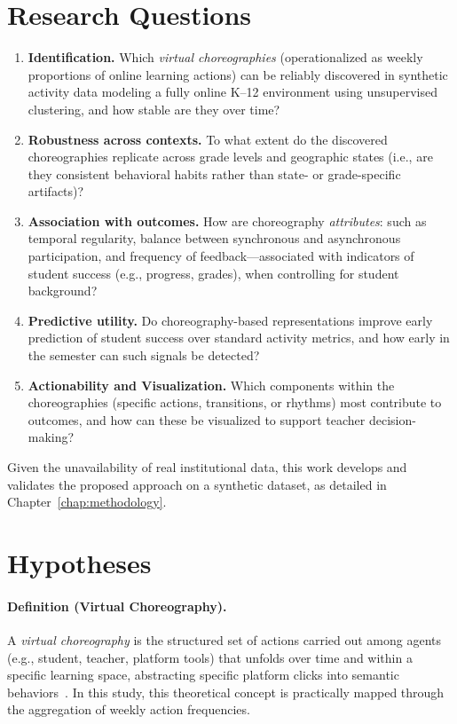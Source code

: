 \section{Research Questions} \label{sec:rqs}
\begin{enumerate}
  \item[\textbf{RQ1}] \textbf{Identification.} Which \emph{virtual choreographies} (operationalized as weekly proportions of online learning actions) can be reliably discovered in synthetic activity data modeling a fully online K--12 environment using unsupervised clustering, and how stable are they over time?
  \item[\textbf{RQ2}] \textbf{Robustness across contexts.} To what extent do the discovered choreographies replicate across grade levels and geographic states (i.e., are they consistent behavioral habits rather than state- or grade-specific artifacts)?
  \item[\textbf{RQ3}] \textbf{Association with outcomes.} How are choreography \emph{attributes}: such as temporal regularity, balance between synchronous and asynchronous participation, and frequency of feedback—associated with indicators of student success (e.g., progress, grades), when controlling for student background?
  \item[\textbf{RQ4}] \textbf{Predictive utility.} Do choreography-based representations improve early prediction of student success over standard activity metrics, and how early in the semester can such signals be detected?
  \item[\textbf{RQ5}] \textbf{Actionability and Visualization.} Which components within the choreographies (specific actions, transitions, or rhythms) most contribute to outcomes, and how can these be visualized to support teacher decision-making?
\end{enumerate}

Given the unavailability of real institutional data, this work develops and validates the proposed approach on a synthetic dataset, as detailed in Chapter~\ref{chap:methodology}.
  

\section{Hypotheses} \label{sec:hypotheses}

\paragraph{Definition (Virtual Choreography).}
A \emph{virtual choreography} is the structured set of actions carried out among agents (e.g., student, teacher, platform tools) that unfolds over time and within a specific learning space, abstracting specific platform clicks into semantic behaviors~\cite{cassola_using_2022}. In this study, this theoretical concept is practically mapped through the aggregation of weekly action frequencies.

